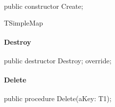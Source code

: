 \documentclass{report}
\newif\ifpdf
\begin{document}
\label{ok_generic_specialize.TSimpleMap-Create}
\begin{list}{}{
\setlength{\itemindent}{0cm}
\setlength{\listparindent}{0cm}
\setlength{\leftmargin}{\evensidemargin}
\addtolength{\leftmargin}{\tmplength}
\settowidth{\labelsep}{X}
\addtolength{\leftmargin}{\labelsep}
\setlength{\labelwidth}{\tmplength}
}
\item[\textbf{Declaration}\hfill]
\ifpdf
\begin{flushleft}
\fi
\begin{ttfamily}
public constructor Create;\end{ttfamily}

\ifpdf
\end{flushleft}
\fi

\par
\item[\textbf{Description}]
TSimpleMap

\end{list}
\paragraph*{Destroy}\hspace*{\fill}

\label{ok_generic_specialize.TSimpleMap-Destroy}
\begin{list}{}{
\setlength{\itemindent}{0cm}
\setlength{\listparindent}{0cm}
\setlength{\leftmargin}{\evensidemargin}
\addtolength{\leftmargin}{\tmplength}
\settowidth{\labelsep}{X}
\addtolength{\leftmargin}{\labelsep}
\setlength{\labelwidth}{\tmplength}
}
\item[\textbf{Declaration}\hfill]
\ifpdf
\begin{flushleft}
\fi
\begin{ttfamily}
public destructor Destroy; override;\end{ttfamily}

\ifpdf
\end{flushleft}
\fi

\end{list}
\paragraph*{Delete}\hspace*{\fill}

\label{ok_generic_specialize.TSimpleMap-Delete}
\begin{list}{}{
\setlength{\itemindent}{0cm}
\setlength{\listparindent}{0cm}
\setlength{\leftmargin}{\evensidemargin}
\addtolength{\leftmargin}{\tmplength}
\settowidth{\labelsep}{X}
\addtolength{\leftmargin}{\labelsep}
\setlength{\labelwidth}{\tmplength}
}
\item[\textbf{Declaration}\hfill]
\ifpdf
\begin{flushleft}
\fi
\begin{ttfamily}
public procedure Delete(aKey: T1);\end{ttfamily}

\ifpdf
\end{flushleft}
\fi

\end{list}
\end{document}
